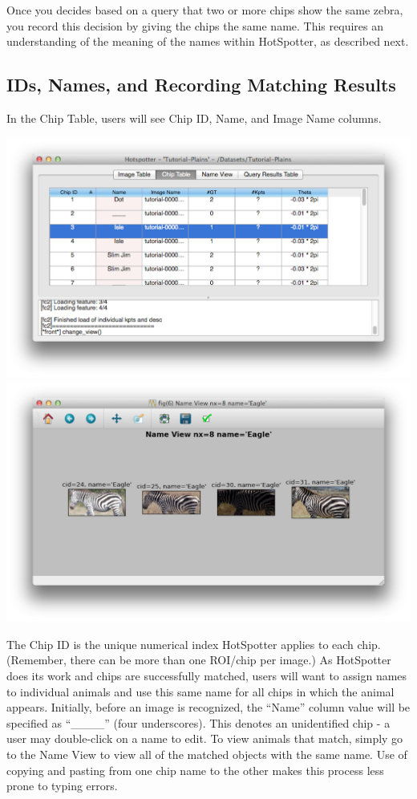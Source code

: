 \documentclass[a4paper,10pt]{article}
\begin{document}
\noindent
  Once you decides based on a query that two or more chips show the
  same zebra, you record this decision by giving the chips the same
  name. This requires an understanding
  of the meaning of the names within HotSpotter, as described next.

\subsection{IDs, Names, and Recording Matching Results}

   In the Chip Table, users will see Chip ID, Name, and Image Name columns.

\begin{center}
            \includegraphics[scale=0.1]{images/names.png}
            \includegraphics[scale=0.1]{images/matches.png}
\end{center}

\noindent
  The Chip ID is the unique numerical index HotSpotter applies to
  each chip.  (Remember, there can be more than one ROI/chip per image.)
  As HotSpotter does its work and chips are successfully matched,
  users will want to assign names to individual animals and use this
  same name for all chips in which the animal appears.  Initially,
  before an image is recognized, the ``Name'' column value will
  be specified as ``\_\_\_\_'' (four underscores).  This denotes an
  unidentified chip - a user may double-click on a name to edit. 
  To view animals that match, simply go to the Name View to view all of the matched objects with the same name. 
  Use of copying and pasting from one chip name to the other makes this process less prone to
  typing errors.
\end{document}
